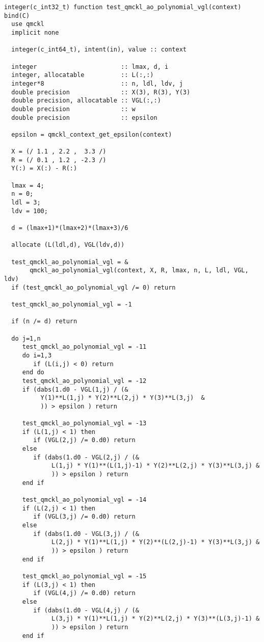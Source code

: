 \begin{verbatim}
integer(c_int32_t) function test_qmckl_ao_polynomial_vgl(context) bind(C)
  use qmckl
  implicit none

  integer(c_int64_t), intent(in), value :: context

  integer                       :: lmax, d, i
  integer, allocatable          :: L(:,:)
  integer*8                     :: n, ldl, ldv, j
  double precision              :: X(3), R(3), Y(3)
  double precision, allocatable :: VGL(:,:)
  double precision              :: w
  double precision              :: epsilon

  epsilon = qmckl_context_get_epsilon(context)

  X = (/ 1.1 , 2.2 ,  3.3 /)
  R = (/ 0.1 , 1.2 , -2.3 /)
  Y(:) = X(:) - R(:)

  lmax = 4;
  n = 0;
  ldl = 3;
  ldv = 100;

  d = (lmax+1)*(lmax+2)*(lmax+3)/6

  allocate (L(ldl,d), VGL(ldv,d))

  test_qmckl_ao_polynomial_vgl = &
       qmckl_ao_polynomial_vgl(context, X, R, lmax, n, L, ldl, VGL, ldv)
  if (test_qmckl_ao_polynomial_vgl /= 0) return

  test_qmckl_ao_polynomial_vgl = -1

  if (n /= d) return 

  do j=1,n
     test_qmckl_ao_polynomial_vgl = -11
     do i=1,3
        if (L(i,j) < 0) return
     end do
     test_qmckl_ao_polynomial_vgl = -12
     if (dabs(1.d0 - VGL(1,j) / (&
          Y(1)**L(1,j) * Y(2)**L(2,j) * Y(3)**L(3,j)  &
          )) > epsilon ) return

     test_qmckl_ao_polynomial_vgl = -13
     if (L(1,j) < 1) then
        if (VGL(2,j) /= 0.d0) return
     else
        if (dabs(1.d0 - VGL(2,j) / (&
             L(1,j) * Y(1)**(L(1,j)-1) * Y(2)**L(2,j) * Y(3)**L(3,j) &
             )) > epsilon ) return
     end if

     test_qmckl_ao_polynomial_vgl = -14
     if (L(2,j) < 1) then
        if (VGL(3,j) /= 0.d0) return
     else
        if (dabs(1.d0 - VGL(3,j) / (&
             L(2,j) * Y(1)**L(1,j) * Y(2)**(L(2,j)-1) * Y(3)**L(3,j) &
             )) > epsilon ) return
     end if

     test_qmckl_ao_polynomial_vgl = -15
     if (L(3,j) < 1) then
        if (VGL(4,j) /= 0.d0) return
     else
        if (dabs(1.d0 - VGL(4,j) / (&
             L(3,j) * Y(1)**L(1,j) * Y(2)**L(2,j) * Y(3)**(L(3,j)-1) &
             )) > epsilon ) return
     end if


\end{verbatim}
